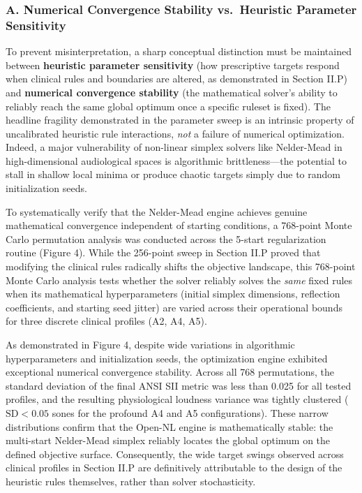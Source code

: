 \documentclass[
  12pt,
]{article}
\begin{document}
\subsubsection{A. Numerical Convergence Stability vs.~Heuristic
Parameter
Sensitivity}\label{a.-numerical-convergence-stability-vs.-heuristic-parameter-sensitivity}

To prevent misinterpretation, a sharp conceptual distinction must be
maintained between \textbf{heuristic parameter sensitivity} (how
prescriptive targets respond when clinical rules and boundaries are
altered, as demonstrated in Section II.P) and \textbf{numerical
convergence stability} (the mathematical solver's ability to reliably
reach the same global optimum once a specific ruleset is fixed). The
headline fragility demonstrated in the parameter sweep is an intrinsic
property of uncalibrated heuristic rule interactions, \emph{not} a
failure of numerical optimization. Indeed, a major vulnerability of
non-linear simplex solvers like Nelder-Mead in high-dimensional
audiological spaces is algorithmic brittleness---the potential to stall
in shallow local minima or produce chaotic targets simply due to random
initialization seeds.

To systematically verify that the Nelder-Mead engine achieves genuine
mathematical convergence independent of starting conditions, a 768-point
Monte Carlo permutation analysis was conducted across the 5-start
regularization routine (Figure 4). While the 256-point sweep in Section
II.P proved that modifying the clinical rules radically shifts the
objective landscape, this 768-point Monte Carlo analysis tests whether
the solver reliably solves the \emph{same} fixed rules when its
mathematical hyperparameters (initial simplex dimensions, reflection
coefficients, and starting seed jitter) are varied across their
operational bounds for three discrete clinical profiles (A2, A4, A5).

As demonstrated in Figure 4, despite wide variations in algorithmic
hyperparameters and initialization seeds, the optimization engine
exhibited exceptional numerical convergence stability. Across all 768
permutations, the standard deviation of the final ANSI SII metric was
less than 0.025 for all tested profiles, and the resulting physiological
loudness variance was tightly clustered (\(\text{SD} < 0.05\) sones for
the profound A4 and A5 configurations). These narrow distributions
confirm that the Open-NL engine is mathematically stable: the
multi-start Nelder-Mead simplex reliably locates the global optimum on
the defined objective surface. Consequently, the wide target swings
observed across clinical profiles in Section II.P are definitively
attributable to the design of the heuristic rules themselves, rather
than solver stochasticity.
\end{document}
